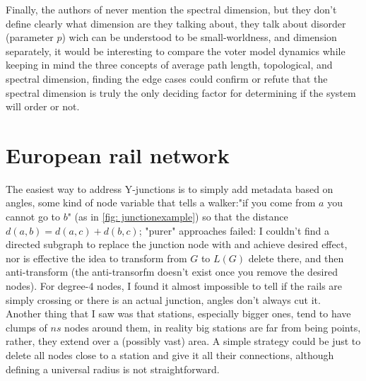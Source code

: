 \begin{appendices}
Finally, the authors of \cite{suchecki2005voter} never mention the spectral dimension, but they don't define clearly what dimension are they talking about, they talk about disorder (parameter $p$) wich can be understood to be small-worldness, and dimension separately, it would be interesting to compare the voter model dynamics while keeping in mind the three concepts of average path length, topological, and spectral dimension, finding the edge cases could confirm or refute that the spectral dimension is truly the only deciding factor for determining if the system will order or not. 
\section{European rail network}
The easiest way to address Y-junctions is to simply add metadata based on angles, some kind of node variable that tells a walker:"if you come from $a$ you cannot go to $b$" (as in \ref{fig: junctionexample}) so that the distance $d(a,b) = d(a,c) + d(b,c)$; "purer" approaches failed: I couldn't find a directed subgraph to replace the junction node with and achieve desired effect, nor is effective the idea to transform from $G$ to $L(G)$ delete there, and then anti-transform (the anti-transorfm doesn't exist once you remove the desired nodes).
For degree-4 nodes, I found it almost impossible to tell if the rails are simply crossing or there is an actual junction, angles don't always cut it.\\ 
Another thing that I saw was that stations, especially bigger ones, tend to have clumps of $ns$ nodes around them, in reality big stations are far from being points, rather, they extend over a (possibly vast) area. A simple strategy could be just to delete all nodes close to a station and give it all their connections, although defining a universal radius is not straightforward.
\end{appendices}
